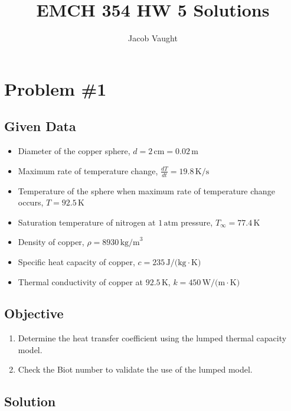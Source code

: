 \documentclass{article}
\title{EMCH 354 HW 5 Solutions}
\author{Jacob Vaught}
\date{}
\numberwithin{equation}{section}
\begin{document}
\maketitle

\section{Problem \#1}
\subsection*{Given Data}
\begin{itemize}
    \item Diameter of the copper sphere, $d = 2 \, \text{cm} = 0.02 \, \text{m}$
    \item Maximum rate of temperature change, $\frac{dT}{dt} = 19.8 \, \text{K/s}$
    \item Temperature of the sphere when maximum rate of temperature change occurs, $T = 92.5 \, \text{K}$
    \item Saturation temperature of nitrogen at $1 \, \text{atm}$ pressure, $T_{\infty} = 77.4 \, \text{K}$
    \item Density of copper, $\rho = 8930 \, \text{kg/m}^3$
    \item Specific heat capacity of copper, $c = 235 \, \text{J/(kg} \cdot \text{K)}$
    \item Thermal conductivity of copper at $92.5 \, \text{K}$, $k = 450 \, \text{W/(m} \cdot \text{K)}$
\end{itemize}

\subsection*{Objective}
\begin{enumerate}
    \item Determine the heat transfer coefficient using the lumped thermal capacity model.
    \item Check the Biot number to validate the use of the lumped model.
\end{enumerate}

\subsection*{Solution}
\end{document}
